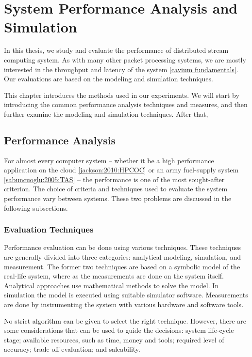 \chapter{System Performance Analysis and Simulation}
\label{chapter:system-performance-analysis-and-simulation}
In this thesis, we study and evaluate the performance of distributed stream computing system. As with many other packet processing systems, we are mostly interested in the throughput and latency of the system \ref{cavium fundamentals}. Our evaluations are based on the modeling and simulation techniques.


This chapter introduces the methods used in our experiments. We will start by introducing the common performance analysis techniques and measures, and then further examine the modeling and simulation techniques. After that, 

\section{Performance Analysis}
For almost every computer system -- whether it be a high performance application on the cloud \ref{jackson:2010:HPCOC} or an army fuel-supply system \ref{sabuncuoglu:2005:TAS} -- the performance is one of the most sought-after criterion. The choice of criteria and techniques used to evaluate the system performance vary between systems. These two problems are discussed in the following subsections.

\subsection{Evaluation Techniques}
Performance evaluation can be done using various techniques. These techniques are generally divided into three categories: analytical modeling, simulation, and measurement. The former two techniques are based on a symbolic model of the real-life system, where as the measurements are done on the system itself. Analytical approaches use mathematical methods to solve the model. In simulation the model is executed using suitable simulator software. Measurements are done by instrumenting the system with various hardware and software tools.

No strict algorithm   can be given to select the right technique. However, there are some considerations that can be used to guide the decisions: system life-cycle stage; available resources, such as time, money and tools; required level of accuracy; trade-off evaluation; and saleability.

